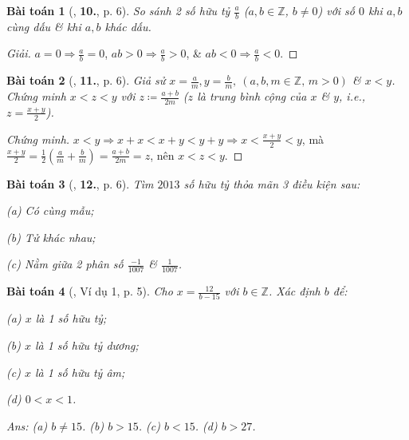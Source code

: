 \documentclass{article}
\numberwithin{equation}{section}
\newtheorem{baitoan}{Bài toán}
\begin{document}
\begin{baitoan}[\cite{Trong_Toan_7_2022}, \textbf{10.}, p. 6]
	So sánh 2 số hữu tỷ $\frac{a}{b}$ ($a,b\in\mathbb{Z}$, $b\ne 0$) với số $0$ khi $a,b$ cùng dấu \& khi $a,b$ khác dấu.
\end{baitoan}

\begin{proof}[Giải]
	$a = 0\Rightarrow\frac{a}{b} = 0$, $ab > 0\Rightarrow\frac{a}{b} > 0$, \& $ab < 0\Rightarrow\frac{a}{b} < 0$.
\end{proof}

\begin{baitoan}[\cite{Trong_Toan_7_2022}, \textbf{11.}, p. 6]
	Giả sử $x = \frac{a}{m},y = \frac{b}{m},\ (a,b,m\in\mathbb{Z},\,m > 0)$ \& $x < y$. Chứng minh $x < z < y$ với $z\coloneqq\frac{a + b}{2m}$ ($z$ là \emph{trung bình cộng} của $x$ \& $y$, i.e., $z = \frac{x + y}{2}$).
\end{baitoan}

\begin{proof}[Chứng minh]
	$x < y\Rightarrow x + x < x + y < y + y\Rightarrow x < \frac{x + y}{2} < y$, mà $\frac{x + y}{2} = \frac{1}{2}\left(\frac{a}{m} + \frac{b}{m}\right) = \frac{a + b}{2m} = z$, nên $x < z < y$.
\end{proof}

\begin{baitoan}[\cite{Trong_Toan_7_2022}, \textbf{12.}, p. 6]
	Tìm $2013$ số hữu tỷ thỏa mãn 3 điều kiện sau:
	\begin{enumerate*}
		\item[(a)] Có cùng mẫu;
		\item[(b)] Tử khác nhau;
		\item[(c)] Nằm giữa 2 phân số $\frac{-1}{1007}$ \& $\frac{1}{1007}$.
	\end{enumerate*}
\end{baitoan}

\begin{baitoan}[\cite{Tuyen_Toan_7}, Ví dụ 1, p. 5]
	Cho $x = \frac{12}{b - 15}$ với $b\in\mathbb{Z}$. Xác định $b$ để:
	\begin{enumerate*}
		\item[(a)] $x$ là 1 số hữu tỷ;
		\item[(b)] $x$ là 1 số hữu tỷ dương;
		\item[(c)] $x$ là 1 số hữu tỷ âm;
		\item[(d)] $0 < x < 1$.
	\end{enumerate*}\hfill\textsf{Ans:} (a) $b\ne 15$. (b) $b > 15$. (c) $b < 15$. (d) $b > 27$.
\end{baitoan}
\end{document}
